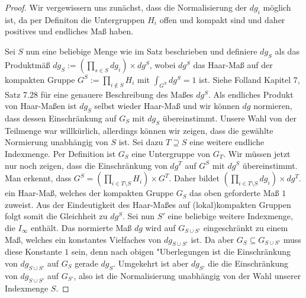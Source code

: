 		\begin{proof}
			Wir vergewissern uns zunächst, dass die Normalisierung der $dg_i$ möglich ist, da per Definiton die Untergruppen $H_i$ offen und kompakt sind und daher positives und endliches Maß haben.
			
			Sei $S$ nun eine beliebige Menge wie im Satz beschrieben und definiere $dg_S$ als das Produktmäß $dg_S :=\left(\prod_{s \in S}dg_i\right) \times dg^S$, wobei $dg^S$ das Haar-Maß auf der kompakten Gruppe $G^S:=\prod_{i \notin S} H_i$ mit $\int_{G^S} dg^S = 1$ ist. 
			Siehe Folland \cite{folland} Kapitel 7, Satz 7.28 für eine genauere Beschreibung des Maßes $dg^S$. 
			Als endliches Produkt von Haar-Maßen ist $dg_S$ selbst wieder Haar-Maß und wir können $dg$ normieren, dass dessen Einschränkung auf $G_S$ mit $dg_S$ übereinstimmt.
			Unsere Wahl von der Teilmenge war willkürlich, allerdings können wir zeigen, dass die gewählte Normierung unabhängig von $S$ ist. Sei dazu $T\supseteq S$ eine weitere endliche Indexmenge. 
			Per Definition ist $G_S$ eine Untergruppe von $G_T$. 
			Wir müssen jetzt nur noch zeigen, dass die Einschränkung von $dg^T$ auf $G^S$ mit $dg^S$ übereinstimmt.
			Man erkennt, dass $G^S = \left(\prod_{i \in T \setminus S} H_i\right) \times G^T$. Daher bildet $\left(\prod_{i \in T \setminus S} dg_i\right) \times dg^T$.
			ein Haar-Maß, welches der kompakten Gruppe $G_S$ das oben geforderte Maß $1$ zuweist. Aus der Eindeutigkeit des Haar-Maßes auf (lokal)kompakten Gruppen folgt somit die Gleichheit zu $dg^S$.
			Sei nun $S'$ eine beliebige weitere Indexmenge, die $I_\infty$ enthält. Das normierte Maß $dg$ wird auf $G_{S\cup S'}$ eingeschränkt zu einem Maß, welches ein konstantes Vielfaches von $dg_{S\cup S'}$ ist. 
			Da aber $G_S \subseteq G_{S\cup S'}$ muss diese Konstante $1$ sein, denn nach obigen "Uberlegungen ist die Einschränkung von $dg_{S\cup S'}$ auf $G_S$ gerade $dg_{S}$.
			Umgekehrt ist aber $dg_{S'}$ die die Einschränkung von $dg_{S\cup S'}$ auf $G_{S'}$, also ist die Normalisierung unabhängig von der Wahl unserer Indexmenge $S$.
		\end{proof}
		
